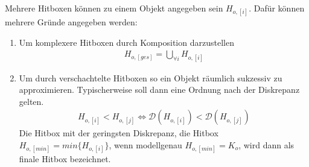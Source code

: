 Mehrere Hitboxen können zu einem Objekt angegeben sein $H_{o, [i]}$. Dafür können mehrere Gründe angegeben werden:
\begin{enumerate}
\item Um komplexere Hitboxen durch Komposition darzustellen 
\begin{align}
H_{o, [ges]} = \bigcup_{\forall i}H_{o, [i]}
\end{align}
\item Um durch verschachtelte Hitboxen so ein Objekt räumlich sukzessiv zu approximieren.
Typischerweise soll dann eine Ordnung nach der Diskrepanz gelten.
\begin{align}
H_{o, [i]} < H_{o, [j]} \Leftrightarrow \mathcal{D}(H_{o, [i]}) < \mathcal{D}(H_{o, [j]})
\end{align}
Die Hitbox mit der geringsten Diskrepanz, die Hitbox $H_{o, [min]}=min\{H_{o, [i]}\}$, wenn modellgenau $H_{o, [min]} = K_o$, wird dann als finale Hitbox bezeichnet.
\end{enumerate}


